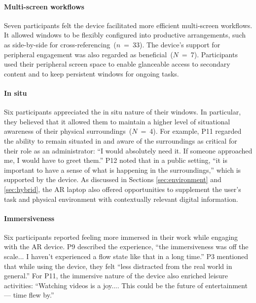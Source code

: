 \paragraph{Multi-screen workflows}
Seven participants 
felt the device facilitated more efficient multi-screen workflows. 
It allowed windows to be flexibly configured into productive arrangements, such as side-by-side for cross-referencing~($n$~=~33).
The device's support for peripheral engagement was also regarded as beneficial~($N$~=~7).
Participants used their peripheral screen space to enable glanceable access to secondary content and to keep persistent windows for ongoing tasks.

\paragraph{In situ}
Six
participants appreciated the in situ nature of their windows. 
In particular, they believed that it allowed them to maintain a higher level of situational awareness of their physical surroundings~($N$~=~4).
For example, P11 regarded the ability to remain situated in and aware of the surroundings as critical for their role as an administrator: ``I would absolutely need it. If someone approached me, I would have to greet them.''
P12 noted that in a public setting, ``it is important to have a sense of what is happening in the surroundings,'' which is supported by the device.
As discussed in Sections \ref{sec:environment} and \ref{sec:hybrid}, 
the AR laptop also offered opportunities to supplement the user's task and physical environment with contextually relevant digital information.

\paragraph{Immersiveness}
Six participants 
reported feeling more immersed in their work while engaging with the AR device. 
P9 described the experience, ``the immersiveness was off the scale... I haven't experienced a flow state like that in a long time.''
P3 mentioned that while using the device, they felt ``less distracted from the real world in general.''
For P11, the immersive nature of the device also enriched leisure activities: ``Watching videos is a joy.... This could be the future of entertainment --- time flew by.''

